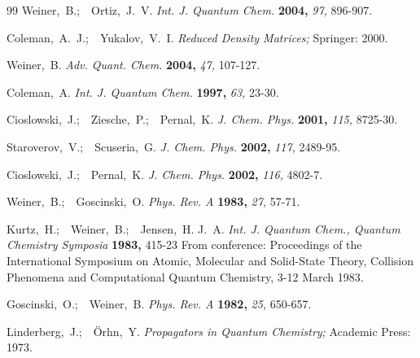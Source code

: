 \documentclass[aps,preprint]{revtex4}%
\begin{document}
\providecommand{\refin}[1]{\\ \textbf{Referenced in:} #1}

\begin{thebibliography}{99}                                                                                               %
Weiner,~B.;\ \ Ortiz,~J.~V. \textit{Int. J. Quantum
Chem.} \textbf{2004,}  \textsl{97,} 896-907.

Coleman,~A.~J.;\ \ Yukalov,~V.~I. \textit{Reduced Density
Matrices;} Springer:  2000.

Weiner,~B. \textit{Adv. Quant. Chem.} \textbf{2004,}
\textsl{47,} 107-127.

Coleman,~A. \textit{Int. J. Quantum Chem.} \textbf{1997,}
\textsl{63,} 23-30.

Cioslowski,~J.;\ \ Ziesche,~P.;\ \ Pernal,~K.
\textit{J. Chem. Phys.}  \textbf{2001,} \textsl{115,} 8725-30.

Staroverov,~V.;\ \ Scuseria,~G. \textit{J. Chem. Phys.}
\textbf{2002,}  \textsl{117,} 2489-95.

Cioslowski,~J.;\ \ Pernal,~K. \textit{J. Chem. Phys.}
\textbf{2002,}  \textsl{116,} 4802-7.

Weiner,~B.;\ \ Goscinski,~O. \textit{Phys. Rev. A}
\textbf{1983,} \textsl{27,}  57-71.

Kurtz,~H.;\ \ Weiner,~B.;\ \ Jensen,~H. J.~A. \textit{Int.
J. Quantum Chem., Quantum Chemistry Symposia} \textbf{1983,} 415-23 From
conference:  Proceedings of the International Symposium on Atomic, Molecular
and  Solid-State Theory, Collision Phenomena and Computational Quantum
Chemistry,  3-12 March 1983.

Goscinski,~O.;\ \ Weiner,~B. \textit{Phys. Rev. A}
\textbf{1982,} \textsl{25,}  650-657.

Linderberg,~J.;\ \ {\"O}rhn,~Y. \textit{Propagators in
Quantum Chemistry;}  Academic Press: 1973.
\end{thebibliography}
\end{document}
